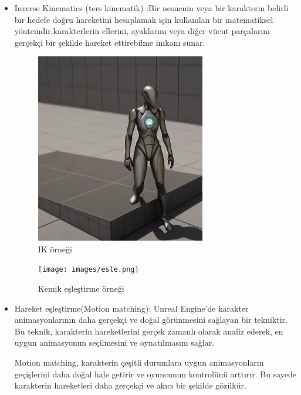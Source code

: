 \documentclass[12pt,a4paper]{article}
\begin{document}
\begin{itemize}
		    \item Inverse Kinematics (ters kinematik) :Bir nesnenin veya bir karakterin belirli bir hedefe doğru hareketini hesaplamak için kullanılan bir matematiksel yöntemdir.karakterlerin ellerini, ayaklarını veya diğer vücut parçalarını gerçekçi bir şekilde hareket ettirebilme imkanı sunar.
		    \begin{center}
		    	\begin{figure}[!htbp]
		    	\includegraphics[width=0.7\textwidth,center]{images/ık.png}\newline
		    	\caption{IK  örneği}
		    	\label{fig:ornek}
		    \end{figure}
		    \end{center}
		 \begin{center}
		 	\begin{figure}[!htbp]
		 	\texttt{[image: images/esle.png]}\cite{youtube}
		 	\caption{Kemik eşleştirme  örneği}
		 	\label{fig:ornek}
		 \end{figure}
		 \end{center}
		 	 	\item Hareket eşleştirme(Motion matching): Unreal Engine'de karakter animasyonlarının daha gerçekçi ve doğal görünmesini sağlayan bir tekniktir. Bu teknik, karakterin hareketlerini gerçek zamanlı olarak analiz ederek, en uygun animasyonun seçilmesini ve oynatılmasını sağlar.
		 	 
		 	 Motion matching, karakterin çeşitli durumlara uygun animasyonların geçişlerini daha doğal hale getirir ve oyuncunun kontrolünü arttırır. Bu sayede karakterin hareketleri daha gerçekçi ve akıcı bir şekilde gözükür.
		 	 

\end{itemize}
\end{document}
